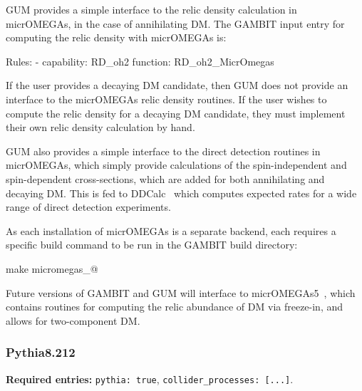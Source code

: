 \documentclass[pdftex,twocolumn,epjc3_preprint,runningheads]{svjour3}
\renewcommand{\_}{\discretionary{\underscore}{}{\underscore}}
\newcommand\term[1]{{\lstset{style=terminal}\lstinline!#1!\lstset{style=cpp}}}
\newcommand\guminline[1]{{{\lstset{style=gum}\lstinline!#1!}}}
\newcommand{\gambit}{\textsf{GAMBIT}\xspace}
\newcommand{\GB}{\gambit}
\newcommand{\pythia}{\textsf{Pythia}\xspace}
\newcommand{\mo}{\micromegas}
\newcommand{\micromegas}{\textsf{micrOMEGAs}\xspace}
\newcommand\ddcalc{\textsf{DDCalc}\xspace}
\newcommand{\gum}{\textsf{GUM}\xspace}
\newcommand{\dgum}{\!\!\term{.gum}\!\xspace}
\begin{document}
\gum provides a simple interface to the relic density calculation in \mo, in the case of annihilating DM.  The \gambit input entry for computing the relic density with \mo is:
%
\begin{lstyaml}
Rules:
  - capability: RD_oh2
    function:   RD_oh2_MicrOmegas
\end{lstyaml}
%
If the user provides a decaying DM candidate, then \gum does not provide an interface to the \mo relic density routines.  If the user wishes to compute the relic density for a decaying DM candidate, they must implement their own relic density calculation by hand.

\gum also provides a simple interface to the direct detection routines in \mo, which simply provide calculations of the spin-independent and spin-dependent cross-sections, which are added for both annihilating and decaying DM.  This is fed to \ddcalc~\cite{DarkBit,HP} which computes expected rates for a wide range of direct detection experiments.

As each installation of \mo is a separate backend, each requires a specific build command to be run in the \gambit build directory:
%
\begin{lstterm}
make micromegas_@\nm@
\end{lstterm}
%

Future versions of \GB and \gum will interface to \mo \textsf{5}~\cite{Belanger:2018ccd}, which contains routines for computing the relic abundance of DM via freeze-in, and allows for two-component DM.

\subsubsection{\pythia \textsf{8.212}} \label{sec:pythia}

\textbf{Required \dgum entries:} \guminline{pythia: true}, \guminline{collider_processes: [...]}.\\
\end{document}
